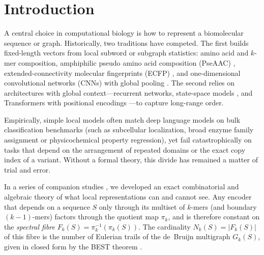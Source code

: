 \documentclass[11pt]{article}
\theoremstyle{plain}
\theoremstyle{definition}
\theoremstyle{remark}
\begin{document}
\section{Introduction}\label{sec:intro}

A central choice in computational biology is how to represent a biomolecular sequence or graph. Historically,
two traditions have competed. The first builds fixed-length vectors from local subword or subgraph statistics:
amino acid and $k$-mer composition, amphiphilic pseudo amino acid composition (PseAAC) \cite{Chou05}, extended-connectivity
molecular fingerprints (ECFP) \cite{Morgan65,RH10}, and one-dimensional convolutional networks (CNNs) with global
pooling \cite{DeepBind,Kim14}. The second relies on architectures with global context—recurrent networks,
state-space models \cite{S4,Mamba}, and Transformers with positional encodings \cite{Vaswani17,ESM2,ProtTrans}—to
capture long-range order.

Empirically, simple local models often match deep language models on bulk classification benchmarks (such as
subcellular localization, broad enzyme family assignment or physicochemical property regression), yet fail
catastrophically on tasks that depend on the arrangement of repeated domains or the exact copy index of a
variant. Without a formal theory, this divide has remained a matter of trial and error.

In a series of companion studies \cite{CC26a,CC26b,CC26c,CC26d,CC26e,CC26f,CC26g,CC26h}, we developed an exact
combinatorial and algebraic theory of what local representations can and cannot see. Any encoder that depends on
a sequence $S$ only through its multiset of $k$-mers (and boundary $(k-1)$-mers) factors through the quotient map
$\pi_k$, and is therefore constant on the \emph{spectral fibre} $F_k(S)=\pi_k^{-1}(\pi_k(S))$. The cardinality
$N_k(S)=|F_k(S)|$ of this fibre is the number of Eulerian trails of the de~Bruijn multigraph $G_k(S)$, given in
closed form by the BEST theorem \cite{BEST,Pev95,Ukk92}.
\end{document}
